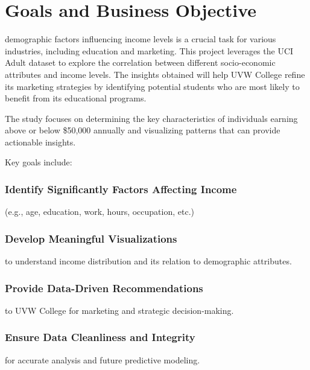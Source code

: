 \documentclass[journal,onecolumn]{IEEEtran}
\begin{document}
\section{Goals and Business Objective}
% 
% 
% 
% 
 demographic factors influencing income levels is 
a crucial task for various industries, including education and marketing. 
This project leverages the UCI Adult dataset to explore the correlation 
between different socio-economic attributes and income levels. The insights 
obtained will help UVW College refine its marketing strategies by 
identifying potential students who are most likely to benefit from its 
educational programs.

The study focuses on determining the key characteristics of individuals 
earning above or below \$50,000 annually and visualizing patterns that can 
provide actionable insights.

Key goals include:

\subsubsection{Identify Significantly Factors Affecting Income}
(e.g., age, education, work, hours, occupation, etc.)
\subsubsection{Develop Meaningful Visualizations}
to understand income distribution and its relation to demographic 
attributes.
\subsubsection{Provide Data-Driven Recommendations}
to UVW College for marketing and strategic decision-making.
\subsubsection{Ensure Data Cleanliness and Integrity}
for accurate analysis and future predictive modeling.
\end{document}
